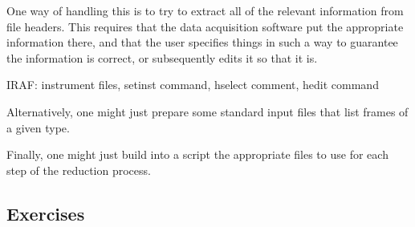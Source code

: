 \documentclass{article}
\begin{document}
One way of handling this is to try to extract all of the relevant
information from file headers. This requires that the data acquisition
software put the appropriate information there, and that the user
specifies things in such a way to guarantee the information is
correct, or subsequently edits it so that it is.

IRAF: instrument files, setinst command, hselect comment, hedit
command

Alternatively, one might just prepare some standard input files that
list frames of a given type.

Finally, one might just build into a script the appropriate files to
use for each step of the reduction process.

\subsection*{Exercises}
\end{document}
